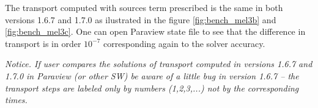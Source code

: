 The transport computed with sources term prescribed is the same in both versions 1.6.7 and 1.7.0 as ilustrated in the figure
\ref{fig:bench_mel3b} and \ref{fig:bench_mel3c}. One can open Paraview state file to see that the difference in transport is in
order $10^{-7}$ corresponding again to the solver accuracy.




\emph{Notice. If user compares the solutions of transport computed in versions 1.6.7 and 1.7.0 in Paraview (or other SW)
be aware of a little bug in version 1.6.7 -- the transport steps are labeled only by numbers (1,2,3,...) not by the 
corresponding times. }


